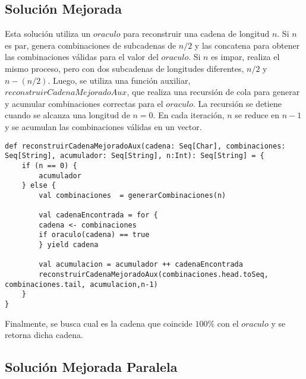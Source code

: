 \documentclass[conference]{IEEEtran}
\begin{document}
\subsection{\textbf{Solución Mejorada}}

Esta solución utiliza un $oraculo$ para reconstruir una cadena de longitud $n$. Si $n$ es par, genera combinaciones de subcadenas de $n/2$ y las concatena para obtener las combinaciones válidas para el valor del $oraculo$. Si $n$ es impar, realiza el mismo proceso, pero con dos subcadenas de longitudes diferentes, $n/2$ y $n-(n/2)$. Luego, se utiliza una función auxiliar, $reconstruirCadenaMejoradoAux$, que realiza una recursión de cola para generar y acumular combinaciones correctas para el $oraculo$. La recursión se detiene cuando se alcanza una longitud de $n=0$. En cada iteración, $n$ se reduce en $n-1$ y se acumulan las combinaciones válidas en un vector.


\begin{lstlisting}
def reconstruirCadenaMejoradoAux(cadena: Seq[Char], combinaciones: Seq[String], acumulador: Seq[String], n:Int): Seq[String] = {
    if (n == 0) {
        acumulador
    } else {
        val combinaciones  = generarCombinaciones(n)
                
        val cadenaEncontrada = for {
        cadena <- combinaciones
        if oraculo(cadena) == true
        } yield cadena
            
        val acumulacion = acumulador ++ cadenaEncontrada
        reconstruirCadenaMejoradoAux(combinaciones.head.toSeq, combinaciones.tail, acumulacion,n-1)
    }
}

\end{lstlisting}


Finalmente, se busca cual es la cadena que coincide $100$\% con el $oraculo$ y se retorna dicha cadena.


\subsection{\textbf{Solución Mejorada Paralela}}
\end{document}
